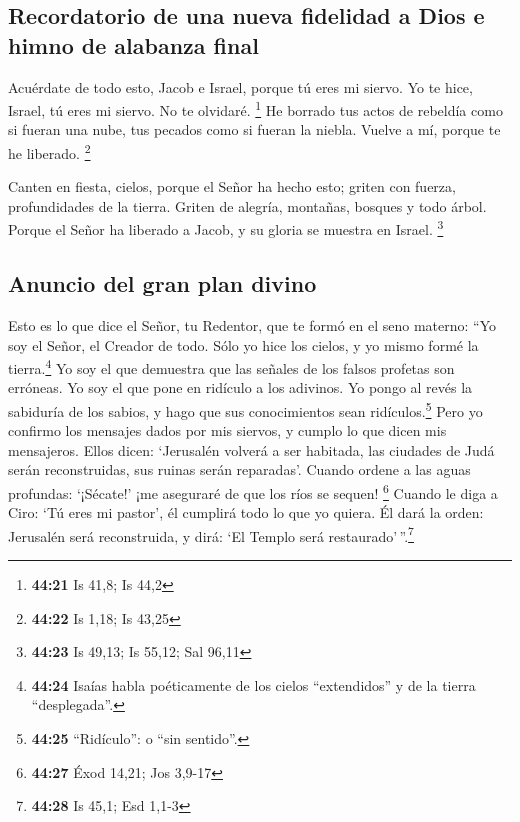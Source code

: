 \hypertarget{recordatorio-de-una-nueva-fidelidad-a-dios-e-himno-de-alabanza-final}{%
\subsection{Recordatorio de una nueva fidelidad a Dios e himno de
alabanza
final}\label{recordatorio-de-una-nueva-fidelidad-a-dios-e-himno-de-alabanza-final}}

 Acuérdate de todo esto, Jacob e Israel, porque tú eres
mi siervo. Yo te hice, Israel, tú eres mi siervo. No te olvidaré.
\footnote{\textbf{44:21} Is 41,8; Is 44,2}  He borrado
tus actos de rebeldía como si fueran una nube, tus pecados como si
fueran la niebla. Vuelve a mí, porque te he liberado. \footnote{\textbf{44:22}
  Is 1,18; Is 43,25}

 Canten en fiesta, cielos, porque el Señor ha hecho esto;
griten con fuerza, profundidades de la tierra. Griten de alegría,
montañas, bosques y todo árbol. Porque el Señor ha liberado a Jacob, y
su gloria se muestra en Israel. \footnote{\textbf{44:23} Is 49,13; Is
  55,12; Sal 96,11}

\hypertarget{anuncio-del-gran-plan-divino}{%
\subsection{Anuncio del gran plan
divino}\label{anuncio-del-gran-plan-divino}}

 Esto es lo que dice el Señor, tu Redentor, que te formó
en el seno materno: ``Yo soy el Señor, el Creador de todo. Sólo yo hice
los cielos, y yo mismo formé la tierra.\footnote{\textbf{44:24} Isaías
  habla poéticamente de los cielos ``extendidos'' y de la tierra
  ``desplegada''.}  Yo soy el que demuestra que las
señales de los falsos profetas son erróneas. Yo soy el que pone en
ridículo a los adivinos. Yo pongo al revés la sabiduría de los sabios, y
hago que sus conocimientos sean ridículos.\footnote{\textbf{44:25}
  ``Ridículo'': o ``sin sentido''.}  Pero yo confirmo los
mensajes dados por mis siervos, y cumplo lo que dicen mis mensajeros.
Ellos dicen: `Jerusalén volverá a ser habitada, las ciudades de Judá
serán reconstruidas, sus ruinas serán reparadas'.  Cuando
ordene a las aguas profundas: `¡Sécate!' ¡me aseguraré de que los ríos
se sequen! \footnote{\textbf{44:27} Éxod 14,21; Jos 3,9-17}
 Cuando le diga a Ciro: `Tú eres mi pastor', él cumplirá
todo lo que yo quiera. Él dará la orden: Jerusalén será reconstruida, y
dirá: `El Templo será restaurado'\,''.\footnote{\textbf{44:28} Is 45,1;
  Esd 1,1-3}

